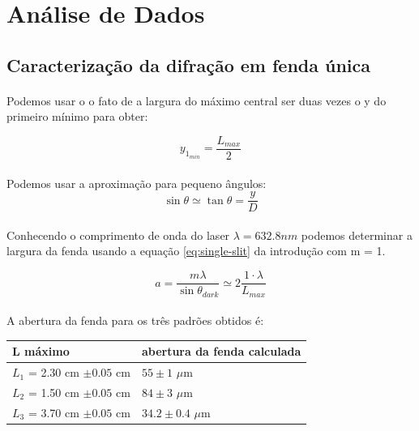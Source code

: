 \documentclass[a4paper,11pt]{article}
\begin{document}
 
\newpage
\section{Análise de Dados}
\subsection{Caracterização da difração em fenda única}
\paragraph{}Podemos usar o o fato de a largura do máximo central
ser duas vezes o y do primeiro mínimo para obter:

\begin{displaymath}
    y_{1_{min}} = \frac{L_{max}}{2}
\end{displaymath}

\paragraph{} Podemos usar a aproximação para pequeno ângulos:
\begin{displaymath}
    \sin \theta \simeq \tan \theta = \frac{y}{D}
\end{displaymath}

\paragraph{}Conhecendo o comprimento de onda do laser
$\lambda = 632.8 nm$ podemos 
determinar a largura da fenda usando a equação
\ref{eq:single-slit} da introdução com m = 1.

\begin{displaymath}
  a = \frac{m \lambda}{\sin \theta _{dark}}\simeq2\frac{1\cdot \lambda}{L_{max}}
\end{displaymath}

\paragraph{} A abertura da fenda para os três padrões obtidos é:
\begin{table}[!htp]
    \centering
    \begin{tabular}{|l|l|}\hline
	L máximo & abertura da fenda calculada 		\\ \hline
      $L_1$ = 2.30 cm $\pm 0.05$ cm & $ 55   \pm 1   $ $ \mu$m \\ \hline
      $L_2$ = 1.50 cm $\pm 0.05$ cm & $ 84   \pm 3   $ $ \mu$m \\ \hline
      $L_3$ = 3.70 cm $\pm 0.05$ cm & $ 34.2 \pm 0.4 $ $ \mu$m \\ \hline
    \end{tabular}
\end{table}
\end{document}
